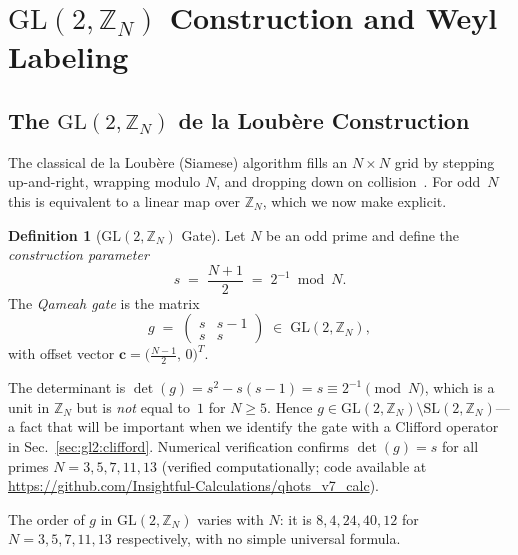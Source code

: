 \documentclass[aip,jmp,reprint,superscriptaddress,floatfix,nofootinbib]{revtex4-2}
\theoremstyle{definition}
\newtheorem{definition}[theorem]{Definition}
\theoremstyle{remark}
\newcommand{\ZN}{\mathbb{Z}_N}
\newcommand{\GL}{\mathrm{GL}}
\newcommand{\SL}{\mathrm{SL}}
\begin{document}
\section{\texorpdfstring{$\GL(2,\ZN)$}{GL(2,ZN)} Construction and Weyl Labeling}
\label{sec:gl2}

\subsection{The \texorpdfstring{$\GL(2,\ZN)$}{GL(2,ZN)} de la Loub\`{e}re Construction}
\label{sec:gl2:gate}

The classical de la Loub\`{e}re (Siamese) algorithm fills an $N \times N$
grid by stepping up-and-right, wrapping modulo $N$, and dropping down
on collision~\cite{Nordgren2012}.  For odd~$N$ this is equivalent to a
linear map over $\ZN$, which we now make explicit.

\begin{definition}[$\GL(2,\ZN)$ Gate]\label{def:gate}
Let $N$ be an odd prime and define the \emph{construction parameter}
\begin{equation}\label{eq:s-def}
s \;=\; \frac{N+1}{2} \;=\; 2^{-1} \bmod N.
\end{equation}
The \emph{Qameah gate} is the matrix
\begin{equation}\label{eq:gate}
g \;=\; \begin{pmatrix} s & s-1 \\ s & s \end{pmatrix}
  \;\in\; \GL(2,\ZN),
\end{equation}
with offset vector $\mathbf{c} = \bigl(\tfrac{N-1}{2},\, 0\bigr)^T$.
\end{definition}

The determinant is
$\det(g) = s^2 - s(s-1) = s \equiv 2^{-1} \pmod{N}$,
which is a unit in $\ZN$ but is \emph{not} equal to~$1$ for
$N \ge 5$.  Hence $g \in \GL(2,\ZN) \setminus \SL(2,\ZN)$---a
fact that will be important when we identify the gate with a
Clifford operator in Sec.~\ref{sec:gl2:clifford}.
Numerical verification confirms
$\det(g) = s$ for all primes $N = 3, 5, 7, 11, 13$
(verified computationally; code available at
\url{https://github.com/Insightful-Calculations/qhots_v7_calc}).

The order of $g$ in $\GL(2,\ZN)$ varies with $N$: it is $8, 4, 24,
40, 12$ for $N = 3, 5, 7, 11, 13$ respectively, with no simple
universal formula.
\end{document}
